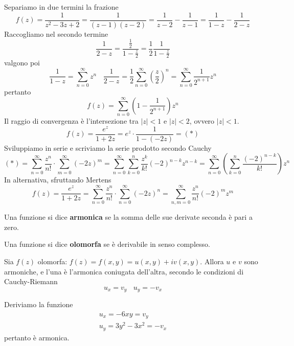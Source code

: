 Separiamo in due termini la frazione
\begin{equation*}
f(z)=\frac{1}{z^{2} -3z+2} =\frac{1}{( z-1)( z-2)} =\frac{1}{z-2} -\frac{1}{z-1} =\frac{1}{1-z} -\frac{1}{2-z}
\end{equation*}
Raccogliamo nel secondo termine
\begin{equation*}
\frac{1}{2-z} =\frac{\frac{1}{2}}{1-\frac{z}{2}} =\frac{1}{2}\frac{1}{1-\frac{z}{2}}
\end{equation*}
valgono poi
\begin{equation*}
\frac{1}{1-z} =\sum ^{\infty }_{n=0} z^{n} \ \ \ \ \frac{1}{2-z} =\frac{1}{2}\sum ^{\infty }_{n=0}\left(\frac{z}{2}\right)^{n} =\sum ^{\infty }_{n=0}\frac{1}{2^{n+1}} z^{n}
\end{equation*}
pertanto
\begin{equation*}
f(z)=\sum ^{\infty }_{n=0}\left( 1-\frac{1}{2^{n+1}}\right) z^{n}
\end{equation*}
Il raggio di convergenza è l'intersezione tra $|z|< 1$ e $|z|< 2$, ovvero $|z|< 1$.
\Soluzione
\begin{equation*}
f(z)=\frac{e^{z}}{1+2z} =e^{z} \cdotp \frac{1}{1-( -2z)} =( *)
\end{equation*}
Sviluppiamo in serie e scriviamo la serie prodotto secondo Cauchy
\begin{equation*}
( *) =\sum ^{\infty }_{n=0}\frac{z^{n}}{n!} \cdotp \sum ^{\infty }_{m=0} (-2z)^{m} =\sum ^{\infty }_{n=0}\sum ^{n}_{k=0}\frac{z^{k}}{k!} (-2)^{n-k} z^{n-k} =\sum ^{\infty }_{n=0}\left(\sum ^{n}_{k=0}\frac{(-2)^{n-k}}{k!}\right) z^{n}
\end{equation*}
In alternativa, sfruttando Mertens
\begin{equation*}
f(z)=\frac{e^{z}}{1+2z} =\sum ^{\infty }_{n=0}\frac{z^{n}}{n!} \cdotp \sum ^{\infty }_{n=0} (-2z)^{n} =\sum ^{\infty }_{n,m=0}\frac{z^{n}}{n!} (-2)^{m} z^{m}
\end{equation*}
\Soluzione
\begin{defn}
Una funzione si dice \textbf{armonica} se la somma delle sue derivate seconda è pari a zero.
\end{defn}
\begin{defn}
Una funzione si dice \textbf{olomorfa} se è derivabile in senso complesso.
\end{defn}
\begin{thm}
Sia $f(z)$ olomorfa: $f(z)=f(x,y)=u(x,y)+iv(x,y)$. Allora $u$ e $v$ sono armoniche, e l'una è l'armonica coniugata dell'altra, secondo le condizioni di Cauchy-Riemann
\begin{equation*}
u_{x} =v_{y} \ \ \ \ u_{y} =-v_{x}
\end{equation*}
\end{thm}
Deriviamo la funzione
\begin{gather*}
u_{x} =-6xy=v_{y}\\
u_{y} =3y^{2} -3x^{2} =-v_{x}
\end{gather*}
pertanto è armonica.

